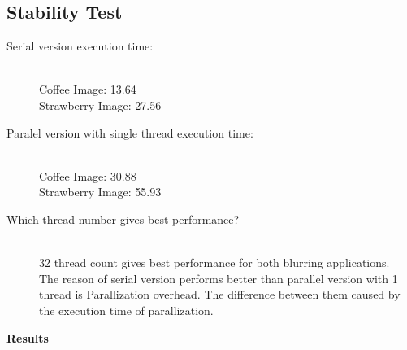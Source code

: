 \documentclass{article}
\begin{document}

\newpage
\subsection{Stability Test}

\begin{description}
    \item[Serial version execution time: ] \hfill \\ 
    Coffee Image: 13.64\\
    Strawberry Image: 27.56\\
    \item[Paralel version with single thread execution time: ] \hfill \\
    Coffee Image: 30.88\\
    Strawberry Image: 55.93\\
    \item[Which thread number gives best performance?] \hfill \\
    32 thread count gives best performance for both blurring applications.
    \\
    The reason of serial version performs better than parallel version with 1 thread is Parallization overhead.
    The difference between them caused by the execution time of parallization.
\end{description}

\textbf{Results}
\end{document}
